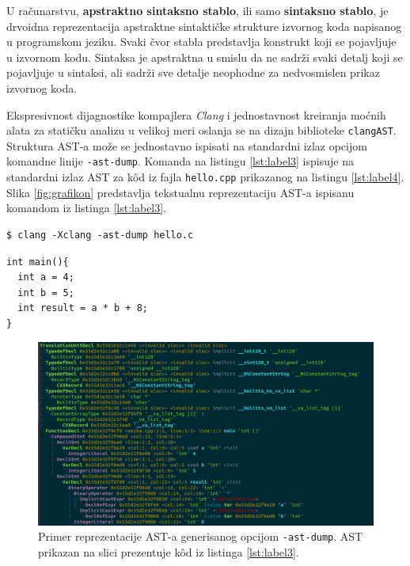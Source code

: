\documentclass[12pt,oneside]{memoir}
\begin{document}
U računarstvu, \textbf{apstraktno sintaksno stablo}, ili samo \textbf{sintaksno stablo}, je drvoidna reprezentacija apstraktne sintaktičke strukture izvornog koda napisanog u programskom jeziku. Svaki čvor stabla predstavlja konstrukt koji se pojavljuje u izvornom kodu.
Sintaksa je apstraktna u smislu da ne sadr\v{z}i svaki detalj koji se pojavljuje u sintaksi, ali sadr\v{z}i sve detalje neophodne za nedvosmislen prikaz izvornog koda.

Ekspresivnost dijagnostike kompajlera \textit{Clang} i jednostavnost kreiranja mo\'{c}nih alata za stati\v{c}ku analizu u velikoj meri oslanja se na dizajn biblioteke \texttt{clangAST}. Struktura AST-a mo\v{z}e se jednostavno ispisati na standardni izlaz opcijom komandne linije \texttt{-ast-dump}. Komanda na listingu \ref{lst:label3} ispisuje na standardni izlaz AST za k\^{o}d iz fajla \texttt{hello.cpp} prikazanog na listingu \ref{lst:label4}. Slika \ref{fig:grafikon} predstavlja tekstualnu reprezentaciju AST-a ispisanu komandom iz listinga \ref{lst:label3}.
\\


\begin{lstlisting}[style=custombash, caption={Komanda za ispisivanje Clang-ovog AST-a.}, label=lst:label3]
$ clang -Xclang -ast-dump hello.c
\end{lstlisting}

\begin{lstlisting}[style=customc, caption={K\^{o}d \v{c}iji je AST prikazan na slici \ref{fig:ASTSlika}.},label=lst:label4]
int main(){
  int a = 4;
  int b = 5;
  int result = a * b + 8;
}
\end{lstlisting}

\begin{figure}[!ht]
  \centering
  \includegraphics[width=1.0\textwidth]{ASTImage.png}
  \caption{Primer reprezentacije AST-a generisanog opcijom \texttt{-ast-dump}. AST prikazan na slici prezentuje k\^{o}d iz listinga \ref{lst:label3}.}
  \label{fig:ASTSlika}
\end{figure}
\end{document}
